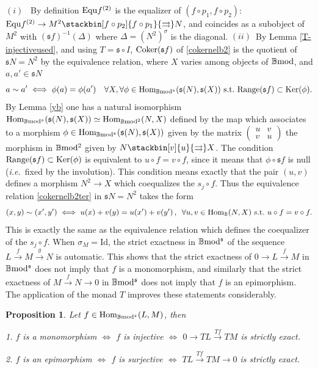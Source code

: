 \documentclass[12pt]{article}
\newtheorem{prop}[thm]{Proposition}
\def\Hom{{\rm Hom}}
\def\id{{\rm id}}
\def\Ker{{\rm Ker}}
\def\equ{{\rm Equ}}
\def\coker{{\rm Coker}}
\def\B{{\mathbb B}}
\def\strg{strict }
\def\strgly{strictly }
\def\qqq{\,,\,~\forall}
\newcommand{\ie}{{\it i.e.\/}\ }
\def\id{{\mbox{Id}}}
\def\Hom {{\mbox{Hom}}}
\def\yb{\mathfrak{s}}
\def\bmod{{\rm \B mod}}
\def\bm2{{\rm \B mod^2}}
\def\b2{{\rm \B mod^{\mathfrak s}}}
\begin{document}
 \proof $(i)$~ By definition $\equ f^{(2)}$ is the equalizer of $(f\circ p_1,f\circ p_2)$: 
$
\equ f^{(2)} \to M^2 \stackbin[f\circ p_2]{f\circ p_1}{\rightrightarrows} N
$, and coincides as a subobject of $M^2$ with $(\yb f)^{-1}(\Delta)$ where $\Delta= (N^2)^\sigma$ is the diagonal.\newline
 $(ii)$~By Lemma \ref{T-injectiveused}, and using $T=\yb\circ I$,    $\coker(\yb f)$ of \eqref{cokernelb2} is the quotient of $\yb N=N^2$ by the equivalence relation, where $X$ varies among objects of $\bmod$, and  $a,a'\in \yb N$
 \begin{equation}\label{cokernelb2ter}
 a\sim a'\iff \phi(a)=\phi(a')~\ ~ \forall X, \forall \phi\in \Hom_\b2(\yb (N),\yb (X))~{\rm s.t.}~ {\rm Range}(\yb f)\subset \Ker(\phi).
\end{equation}
 By Lemma \ref{yb} one has a natural isomorphism 
 $\Hom_\b2(\yb (N),\yb (X)) \simeq \Hom_\bm2(N,X)$  defined by the map which associates to a morphism  $\phi\in\Hom_\b2(\yb (N),\yb (X))$ given by the  matrix $\left(
\begin{array}{cc}
 u & v  \\
 v & u 
\end{array}
\right)$ the morphism in $\bm2$ given by $N\stackbin[v]{u}{\rightrightarrows} X$. The condition 
${\rm Range}(\yb f)\subset \Ker(\phi)$ is equivalent to $u\circ f=v\circ f$, since it means that $\phi\circ \yb f$ is null (\ie fixed by the involution). This condition means exactly that the pair $(u,v)$ defines a morphism $N^2\to X$ which coequalizes the $s_j\circ f$. Thus the equivalence relation
\eqref{cokernelb2ter} in $\yb N=N^2$ takes the form
$$
(x,y)\sim (x',y')\iff u(x)+v(y)=u(x')+v(y')\qqq u,v\in \Hom_\B(N,X)~{\rm s.t.}~ u\circ f=v\circ f.
$$
This is exactly the same as the equivalence relation which defines the coequalizer of the $s_j\circ f$.
\endproof 
When $\sigma_M=\id$, the \strg exactness in $\b2$ of the sequence $L\stackrel{f}{\to} M\stackrel{g}{\to}N$ is automatic. This shows that the \strg exactness of $0 \to L\stackrel{f}{\to}M$  in  $\b2$  does not imply that $f$ is a monomorphism, and similarly that the \strg exactness of $M\stackrel{f}{\to}N\to 0$ in  $\b2$ does not imply that $f$ is an epimorphism.  The application of the monad $T$ improves these statements considerably.
 \begin{prop}\label{use of T} Let $f\in \Hom_\b2(L,M)$, then
 
1. $f$ is a monomorphism  $\iff$ $f$ is injective $\iff$ $0 \to TL\stackrel{Tf}{\to}TM$ is \strgly exact.

2. $f$ is an epimorphism  $\iff$ $f$ is surjective $\iff$ $TL\stackrel{Tf}{\to}TM\to 0$ is \strgly exact.

\end{prop}
\end{document}
